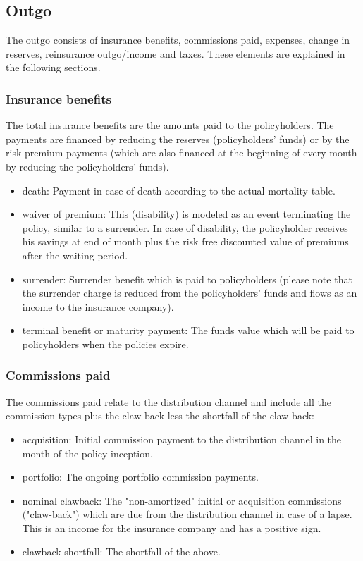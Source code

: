 \subsection{Outgo}
The outgo consists of insurance benefits, commissions paid, expenses, change in reserves, reinsurance outgo/income and taxes. These elements are explained in the following sections.

\subsubsection{Insurance benefits}
The total insurance benefits are the amounts paid to the policyholders. The payments are financed by reducing the reserves (policyholders' funds) or by the risk premium payments (which are also financed at the beginning of every month by reducing the policyholders' funds).
\begin{itemize}
	\item death: Payment in case of death according to the actual mortality table.
	\item waiver of premium: This (disability) is modeled as an event terminating the policy, similar to a surrender. In case of disability, the policyholder receives his savings at end of month plus the risk free discounted value of premiums after the waiting period.
	\item surrender: Surrender benefit which is paid to policyholders (please note that the surrender charge is reduced from the policyholders' funds and flows as an income to the insurance company).
	\item terminal benefit or maturity payment: The funds value which will be paid to policyholders when the policies expire.
\end{itemize}

\subsubsection{Commissions paid}

The commissions paid relate to the distribution channel and include all the commission types plus the claw-back less the shortfall of the claw-back:
\begin{itemize}
	\item acquisition: Initial commission payment to the distribution channel in the month of the policy inception.
	\item portfolio: The ongoing portfolio commission payments.
	\item nominal clawback: The "non-amortized" initial or acquisition commissions ("claw-back") which are due from the distribution channel in case of a lapse. This is an income for the insurance company and has a positive sign.
	\item clawback shortfall: The shortfall of the above.
\end{itemize}

